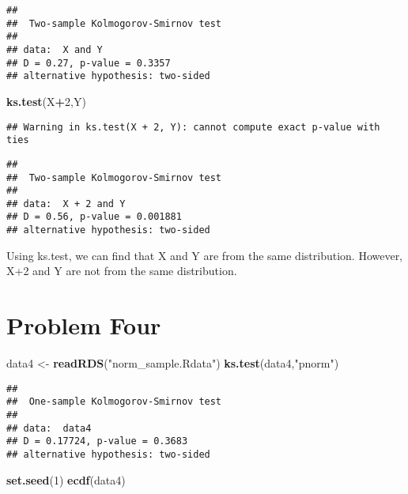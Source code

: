 \documentclass[]{article}
\newenvironment{Shaded}{\begin{snugshade}}{\end{snugshade}}
\newcommand{\KeywordTok}[1]{\textcolor[rgb]{0.13,0.29,0.53}{\textbf{#1}}}
\newcommand{\DecValTok}[1]{\textcolor[rgb]{0.00,0.00,0.81}{#1}}
\newcommand{\StringTok}[1]{\textcolor[rgb]{0.31,0.60,0.02}{#1}}
\newcommand{\OperatorTok}[1]{\textcolor[rgb]{0.81,0.36,0.00}{\textbf{#1}}}
\newcommand{\NormalTok}[1]{#1}
\begin{document}
\begin{verbatim}
## 
##  Two-sample Kolmogorov-Smirnov test
## 
## data:  X and Y
## D = 0.27, p-value = 0.3357
## alternative hypothesis: two-sided
\end{verbatim}

\begin{Shaded}
\begin{Highlighting}[]
\KeywordTok{ks.test}\NormalTok{(X}\OperatorTok{+}\DecValTok{2}\NormalTok{,Y)}
\end{Highlighting}
\end{Shaded}

\begin{verbatim}
## Warning in ks.test(X + 2, Y): cannot compute exact p-value with ties
\end{verbatim}

\begin{verbatim}
## 
##  Two-sample Kolmogorov-Smirnov test
## 
## data:  X + 2 and Y
## D = 0.56, p-value = 0.001881
## alternative hypothesis: two-sided
\end{verbatim}

Using ks.test, we can find that X and Y are from the same distribution.
However, X+2 and Y are not from the same distribution.

\section{Problem Four}\label{problem-four}

\begin{Shaded}
\begin{Highlighting}[]
\NormalTok{data4 <-}\StringTok{ }\KeywordTok{readRDS}\NormalTok{(}\StringTok{"norm_sample.Rdata"}\NormalTok{)}
\KeywordTok{ks.test}\NormalTok{(data4,}\StringTok{"pnorm"}\NormalTok{)}
\end{Highlighting}
\end{Shaded}

\begin{verbatim}
## 
##  One-sample Kolmogorov-Smirnov test
## 
## data:  data4
## D = 0.17724, p-value = 0.3683
## alternative hypothesis: two-sided
\end{verbatim}

\begin{Shaded}
\begin{Highlighting}[]
\KeywordTok{set.seed}\NormalTok{(}\DecValTok{1}\NormalTok{)}
\KeywordTok{ecdf}\NormalTok{(data4)}
\end{Highlighting}
\end{Shaded}
\end{document}
